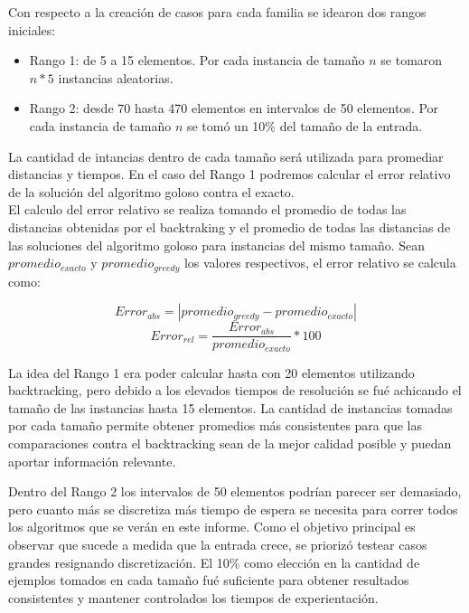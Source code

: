 Con respecto a la creación de casos para cada familia se idearon dos rangos iniciales:

\begin{itemize}
\item Rango 1: de 5 a 15 elementos. Por cada instancia de tamaño $n$ se tomaron $n*5$ instancias aleatorias.
\item Rango 2: desde 70 hasta 470 elementos en intervalos de 50 elementos. Por cada instancia de tamaño $n$ se tomó un 10\% del tamaño de la entrada. 
\end{itemize}

La cantidad de intancias dentro de cada tamaño será utilizada para promediar distancias y tiempos. En el caso del Rango 1 podremos calcular el error relativo de la solución del algoritmo goloso contra el exacto.\\

El calculo del error relativo se realiza tomando el promedio de todas las distancias obtenidas por el backtraking y el promedio de todas las distancias de las soluciones del algoritmo goloso para instancias del mismo tamaño. Sean $promedio_{exacto}$ y $promedio_{greedy}$ los valores respectivos, el error relativo se calcula como:

\begin{equation}
Error_{abs} = |promedio_{greedy}-promedio_{exacto}|
\end{equation}
\begin{equation}
Error_{rel} = \frac{Error_{abs}}{promedio_{exacto}} \ast 100
\end{equation}

La idea del Rango 1 era poder calcular hasta con 20 elementos utilizando backtracking, pero debido a los elevados tiempos de resolución se fué achicando el tamaño de las instancias hasta 15 elementos. La cantidad de instancias tomadas por cada tamaño permite obtener promedios más consistentes para que las comparaciones contra el backtracking sean de la mejor calidad posible y puedan aportar información relevante.

Dentro del Rango 2 los intervalos de 50 elementos podrían parecer ser demasiado, pero cuanto más se discretiza más tiempo de espera se necesita para correr todos los algoritmos que se verán en este informe. Como el objetivo principal es observar que sucede a medida que la entrada crece, se priorizó testear casos grandes resignando discretización.
El 10\% como elección en la cantidad de ejemplos tomados en cada tamaño fué suficiente para obtener resultados consistentes y mantener controlados los tiempos de experientación.

